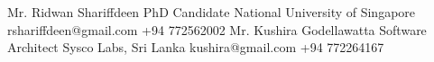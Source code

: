 
\vspace*{0.2cm}
\begin{referees}
		{Mr. Ridwan Shariffdeen}
		{PhD Candidate }
		{National University of Singapore}
		{rshariffdeen@gmail.com}
		{+94 772562002}
		{Mr. Kushira Godellawatta}
		{Software Architect}
		{Sysco Labs, Sri Lanka}
		{kushira@gmail.com}
		{+94 772264167}
\end{referees}
